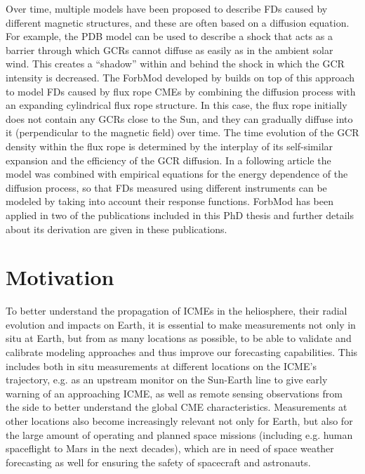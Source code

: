 Over time, multiple models have been proposed to describe \acp{FD} caused by different magnetic structures, and these are often based on a diffusion equation. For example, the \acl{PDB} model \citep[\acs{PDB},][]{Wibberenz-1998} can be used to describe a shock that acts as a barrier through which \acp{GCR} cannot diffuse as easily as in the ambient solar wind. This creates a ``shadow'' within and behind the shock in which the \ac{GCR} intensity is decreased.
The \ac{ForbMod} developed by \citet{Dumbovic2018-ForbMod} builds on top of this approach to model \acp{FD} caused by flux rope \acp{CME} by combining the diffusion process with an expanding cylindrical flux rope structure. In this case, the flux rope initially does not contain any \acp{GCR} close to the Sun, and they can gradually diffuse into it (perpendicular to the magnetic field) over time. The time evolution of the \ac{GCR} density within the flux rope is determined by the interplay of its self-similar expansion and the efficiency of the \ac{GCR} diffusion. In a following article \citep{Dumbovic-2020-ForbMod} the model was combined with empirical equations for the energy dependence of the diffusion process, so that \acp{FD} measured using different instruments can be modeled by taking into account their response functions. \ac{ForbMod} has been applied in two of the publications included in this PhD thesis \citep{Forstner-2020,Forstner-2021-SolO} and further details about its derivation are given in these publications.

\section{Motivation}
\label{sec:motivation}

To better understand the propagation of \acp{ICME} in the heliosphere, their radial evolution and impacts on Earth, it is essential to make measurements not only in situ at Earth, but from as many locations as possible, to be able to validate and calibrate modeling approaches and thus improve our forecasting capabilities. This includes both in situ measurements at different locations on the \ac{ICME}'s trajectory, e.g. as an upstream monitor on the Sun-Earth line to give early warning of an approaching \ac{ICME}, as well as remote sensing observations from the side to better understand the global \ac{CME} characteristics. Measurements at other locations also become increasingly relevant not only for Earth, but also for the large amount of operating and planned space missions (including e.g. human spaceflight to Mars in the next decades), which are in need of space weather forecasting as well for ensuring the safety of spacecraft and astronauts.

